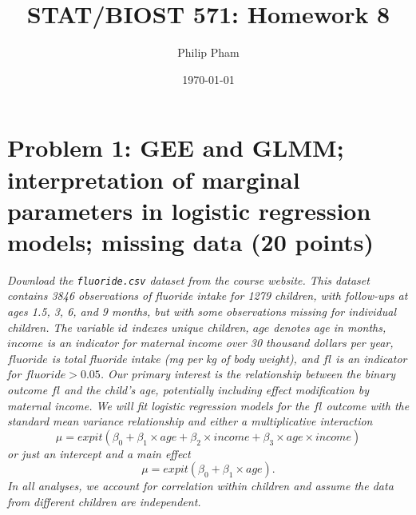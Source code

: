 \documentclass[11pt, letterpaper]{article}
\title{STAT/BIOST 571: Homework 8}
\author{Philip Pham}
\date{\today}
\begin{document}
\maketitle

\section*{Problem 1: GEE and GLMM; interpretation of marginal parameters in logistic regression models; missing data (20 points)}
 
{\em Download the \texttt{fluoride.csv} dataset from the course website.  This dataset contains 3846 observations of fluoride intake for 1279 children, with follow-ups at ages 1.5, 3, 6, and 9 months, but with some observations missing for individual children.  The variable $id$ indexes unique children, $age$ denotes age in months, $income$ is an indicator for maternal income over 30 thousand dollars per year, $fluoride$ is total 
fluoride intake (mg per kg of body weight), and $fl$ is an indicator for $fluoride > 0.05$.
Our primary interest is the relationship between the binary outcome $fl$ and the child's age, potentially
including effect modification by maternal income.  We will fit logistic regression models for the $fl$ outcome with the 
standard mean variance relationship and either a multiplicative interaction 
\begin{equation}
\label{eq:interact}
\mu=expit(\beta_0 + \beta_1 \times age + \beta_2 \times income + \beta_3 \times age \times income)
\end{equation}
or just an intercept and a main effect 
\begin{equation}
\label{eq:nointeract}
\mu=expit(\beta_0 + \beta_1 \times age). 
\end{equation}
In all analyses, we account for correlation within children and assume the data from different children are independent.}
\end{document}
